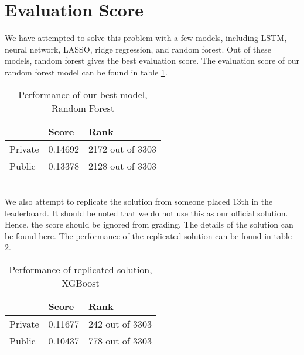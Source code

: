 \section{Evaluation Score}
We have attempted to solve this problem with a few models, including LSTM, neural network, LASSO, ridge regression, and random forest. Out of these models, random forest gives the best evaluation score. The evaluation score of our random forest model can be found in table \ref{tab:evaluation_score_our_model}.
\begin{table}[h]
	\centering
	\caption{Performance of our best model, Random Forest}
	\label{tab:evaluation_score_our_model}
	\begin{tabular}{l|l|l|}
		\cline{2-3}
		& Score   & Rank             \\ \hline
		\multicolumn{1}{|l|}{Private} & 0.14692 & 2172 out of 3303 \\ \hline
		\multicolumn{1}{|l|}{Public}  & 0.13378 & 2128 out of 3303 \\ \hline
	\end{tabular}
\end{table} \\
We also attempt to replicate the solution from someone placed 13th in the leaderboard. It should be noted that we do not use this as our official solution. Hence, the score should be ignored from grading. The details of the solution can be found \href{https://starcraft.com/en-us/articles/20674424}{here}. The performance of the replicated solution can be found in table \ref{tab:evaluation_score_best_model}.
\begin{table}[h]
\centering
\caption{Performance of replicated solution, XGBoost}
\label{tab:evaluation_score_best_model}
\begin{tabular}{l|l|l|}
	\cline{2-3}
	& Score   & Rank            \\ \hline
	\multicolumn{1}{|l|}{Private} & 0.11677 & 242 out of 3303 \\ \hline
	\multicolumn{1}{|l|}{Public}  & 0.10437 & 778 out of 3303 \\ \hline
\end{tabular}
\end{table}
